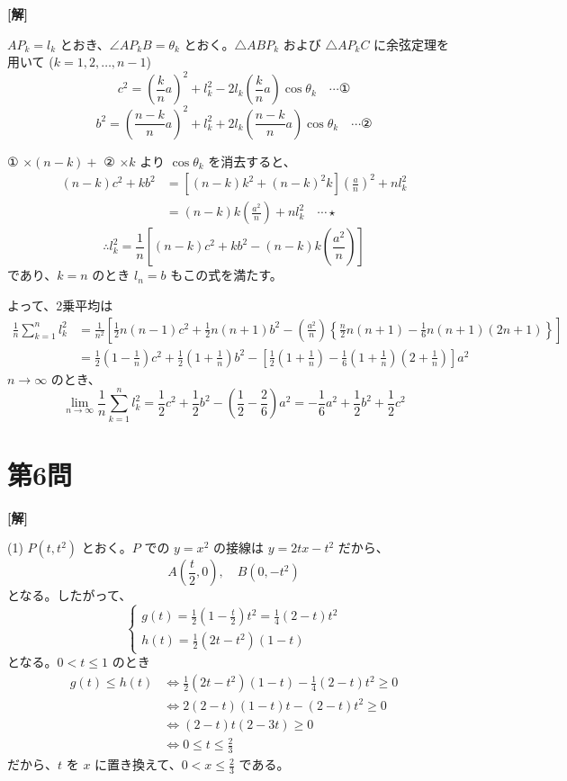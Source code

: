 \documentclass[../main.tex]{subfiles}
\begin{document}
\noindent
\textbf{[解]}

$AP_k = l_k$ とおき、$\angle AP_k B = \theta_k$ とおく。$\triangle ABP_k$ および $\triangle AP_k C$ に余弦定理を用いて ($k = 1, 2, \dots, n-1$)
\[
  c^2 = \left(\frac{k}{n}a\right)^2 + l_k^2 - 2 l_k \left(\frac{k}{n}a\right) \cos \theta_k \quad \cdots \text{①}
\]
\[
  b^2 = \left(\frac{n-k}{n}a\right)^2 + l_k^2 + 2 l_k \left(\frac{n-k}{n}a\right) \cos \theta_k \quad \cdots \text{②}
\]

① $\times (n-k) +$ ② $\times k$ より $\cos \theta_k$ を消去すると、
\begin{align*}
  (n-k)c^2 + k b^2 &= \left[ (n-k)k^2 + (n-k)^2 k \right] \left(\frac{a}{n}\right)^2 + n l_k^2 \\
  &= (n-k)k \left(\frac{a^2}{n}\right) + n l_k^2 \quad \cdots \star
\end{align*}
\[
  \therefore l_k^2 = \frac{1}{n} \left[ (n-k)c^2 + k b^2 - (n-k)k \left(\frac{a^2}{n}\right) \right]
\]
であり、$k=n$ のとき $l_n = b$ もこの式を満たす。

よって、2乗平均は
\begin{align*}
  \frac{1}{n} \sum_{k=1}^n l_k^2 &= \frac{1}{n^2} \left[ \frac{1}{2}n(n-1)c^2 + \frac{1}{2}n(n+1)b^2 - \left(\frac{a^2}{n}\right) \left\{ \frac{n}{2}n(n+1) - \frac{1}{6}n(n+1)(2n+1) \right\} \right] \\
  &= \frac{1}{2}\left(1 - \frac{1}{n}\right)c^2 + \frac{1}{2}\left(1 + \frac{1}{n}\right)b^2 - \left[ \frac{1}{2}\left(1 + \frac{1}{n}\right) - \frac{1}{6}\left(1 + \frac{1}{n}\right)\left(2 + \frac{1}{n}\right) \right] a^2
\end{align*}
$n \to \infty$ のとき、
\[
  \lim_{n \to \infty} \frac{1}{n} \sum_{k=1}^n l_k^2 = \frac{1}{2}c^2 + \frac{1}{2}b^2 - \left( \frac{1}{2} - \frac{2}{6} \right) a^2 = -\frac{1}{6}a^2 + \frac{1}{2}b^2 + \frac{1}{2}c^2
\]

\newpage

\section*{第6問}

\noindent
\textbf{[解]}

(1) $P(t, t^2)$ とおく。$P$ での $y=x^2$ の接線は $y = 2tx - t^2$ だから、
\[
  A\left(\frac{t}{2}, 0\right), \quad B(0, -t^2)
\]
となる。したがって、
\[
  \begin{cases}
    g(t) = \frac{1}{2}\left(1 - \frac{t}{2}\right) t^2 = \frac{1}{4}(2-t)t^2 \\[1ex]
    h(t) = \frac{1}{2}(2t - t^2)(1-t)
  \end{cases}
\]
となる。$0 < t \le 1$ のとき
\begin{align*}
  g(t) \le h(t) &\iff \frac{1}{2}(2t - t^2)(1-t) - \frac{1}{4}(2-t)t^2 \ge 0 \\
  &\iff 2(2-t)(1-t)t - (2-t)t^2 \ge 0 \\
  &\iff (2-t)t(2-3t) \ge 0 \\
  &\iff 0 \le t \le \frac{2}{3}
\end{align*}
だから、$t$ を $x$ に置き換えて、$0 < x \le \frac{2}{3}$ である。
\end{document}
